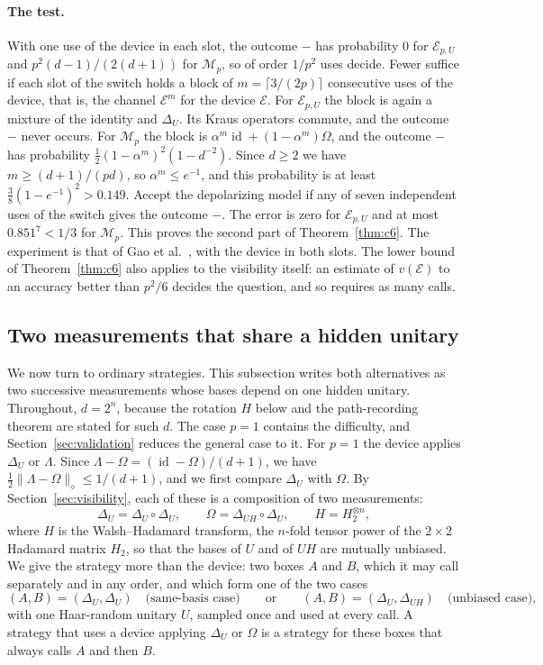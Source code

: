 \documentclass[11pt,letterpaper]{article}
\theoremstyle{definition}\newtheorem{definition}[theorem]{Definition}
\newcommand{\norm}[1]{\lVert#1\rVert}
\newcommand{\id}{\operatorname{id}}
\begin{document}
\paragraph{The test.}
With one use of the device in each slot, the outcome $-$ has
probability $0$ for $\mathcal E_{p,U}$ and $p^2(d-1)/(2(d+1))$ for
$\mathcal M_p$, so of order $1/p^2$ uses decide. Fewer suffice if each
slot of the switch holds a block of $m=\lceil3/(2p)\rceil$ consecutive
uses of the device, that is, the channel $\mathcal E^m$ for the device
$\mathcal E$. For $\mathcal E_{p,U}$ the block is again a mixture of
the identity and $\Delta_U$. Its Kraus operators commute, and the
outcome $-$ never occurs. For $\mathcal M_p$ the block is
$\alpha^m\id+(1-\alpha^m)\Omega$, and the outcome $-$ has probability
$\frac12(1-\alpha^m)^2(1-d^{-2})$. Since $d\ge2$ we have
$m\ge(d+1)/(pd)$, so $\alpha^m\le e^{-1}$, and this probability is at
least $\frac38(1-e^{-1})^2>0.149$. Accept the depolarizing model if any of
seven independent uses of the switch gives the outcome $-$. The error is zero for
$\mathcal E_{p,U}$ and at most $0.851^7<1/3$ for $\mathcal M_p$. This
proves the second part of Theorem~\ref{thm:c6}. The experiment is that
of Gao et al.~\cite{gao2023}, with the device in both slots. The lower
bound of Theorem~\ref{thm:c6} also applies to the visibility itself: an
estimate of $v(\mathcal E)$ to an accuracy better than $p^2/6$ decides
the question, and so requires as many calls.

\subsection{Two measurements that share a hidden unitary}\label{sec:pair}

We now turn to ordinary strategies. This subsection writes both
alternatives as two successive measurements whose bases depend on one
hidden unitary. Throughout, $d=2^n$, because the rotation $H$ below
and the path-recording theorem are stated for such $d$. The case
$p=1$ contains the difficulty, and Section~\ref{sec:validation} reduces the general case
to it. For $p=1$ the device applies $\Delta_U$ or $\Lambda$. Since
$\Lambda-\Omega=(\id-\Omega)/(d+1)$, we have
$\frac12\norm{\Lambda-\Omega}_\diamond\le1/(d+1)$, and we first compare
$\Delta_U$ with $\Omega$. By Section~\ref{sec:visibility}, each of
these is a composition of two measurements:
\[
 \Delta_U=\Delta_U\circ\Delta_U,\qquad
 \Omega=\Delta_{UH}\circ\Delta_U,\qquad H=H_2^{\otimes n},
\]
where $H$ is the Walsh--Hadamard transform, the $n$-fold tensor power
of the $2\times2$ Hadamard matrix $H_2$, so that the bases of $U$ and
of $UH$ are mutually unbiased. We give the strategy more than the
device: two boxes $A$ and $B$, which it may call separately and in any
order, and which form one of the two cases
\begin{equation}\label{eq:c6-priors}
 (A,B)=(\Delta_U,\Delta_U)\quad\text{(same-basis case)}
 \qquad\text{or}\qquad
 (A,B)=(\Delta_U,\Delta_{UH})\quad\text{(unbiased case)},
\end{equation}
with one Haar-random unitary $U$, sampled once and used at every call.
A strategy that uses a device applying $\Delta_U$ or $\Omega$ is a
strategy for these boxes that always calls $A$ and then $B$.
\end{document}
